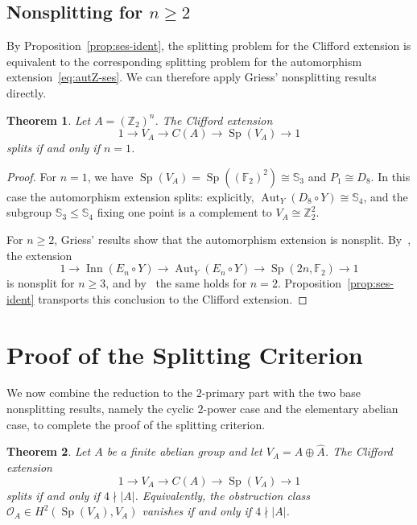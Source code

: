\documentclass[11pt, reqno]{amsart}
\newtheorem{theorem}{Theorem}[section]
\theoremstyle{definition}
\theoremstyle{remark}
\newcommand{\Z}{\mathbb{Z}}
\newcommand{\cO}{\mathcal{O}}
\newcommand{\F}{\mathbb{F}}
\DeclareMathOperator{\Aut}{Aut}
\DeclareMathOperator{\Inn}{Inn}
\DeclareMathOperator{\Sp}{Sp}
\begin{document}
\subsection{Nonsplitting for \texorpdfstring{$n \geq 2$}{n >= 2}}

By Proposition~\ref{prop:ses-ident}, the splitting problem for the Clifford extension is equivalent to the corresponding splitting problem for the automorphism extension~\eqref{eq:autZ-ses}. We can therefore apply Griess' nonsplitting results directly.

\begin{theorem}\label{thm:elem-abelian-nonsplit}
Let $A = (\Z_2)^n$. The Clifford extension
\[
1 \longrightarrow V_A \longrightarrow C(A) \longrightarrow \Sp(V_A) \longrightarrow 1
\]
splits if and only if $n = 1$.
\end{theorem}

\begin{proof}
For $n = 1$, we have $\Sp(V_A) = \Sp((\F_2)^2) \cong \mathbb{S}_3$ and $P_1 \cong D_8$. In this case the automorphism extension splits: explicitly, $\Aut_Y(D_8 \circ Y) \cong \mathbb{S}_4$, and the subgroup $\mathbb{S}_3 \leq \mathbb{S}_4$ fixing one point is a complement to $V_A \cong \Z_2^2$.

For $n \geq 2$, Griess' results show that the automorphism extension is nonsplit. By~\cite[Corollary~2]{Griess1973}, the extension
\[
1 \longrightarrow \Inn(E_n \circ Y) \longrightarrow \Aut_Y(E_n \circ Y) \longrightarrow \Sp(2n,\F_2) \longrightarrow 1
\]
is nonsplit for $n \geq 3$, and by~\cite[Corollary~3]{Griess1973} the same holds for $n = 2$. Proposition~\ref{prop:ses-ident} transports this conclusion to the Clifford extension.
\end{proof}


\section{Proof of the Splitting Criterion}\label{sec:splitting-criterion}

We now combine the reduction to the $2$-primary part with the two base nonsplitting results,
namely the cyclic $2$-power case and the elementary abelian case, to complete the proof of the splitting criterion.

\begin{theorem}\label{thm:splitting-criterion}
Let $A$ be a finite abelian group and let $V_A=A\oplus \widehat A$.
The Clifford extension
\begin{equation}\label{eq:main-ext}
1 \longrightarrow V_A \longrightarrow C(A) \longrightarrow \Sp(V_A) \longrightarrow 1
\end{equation}
splits if and only if $4 \nmid |A|$.
Equivalently, the obstruction class $\cO_A\in H^2(\Sp(V_A),V_A)$ vanishes if and only if $4 \nmid |A|$.
\end{theorem}
\end{document}
